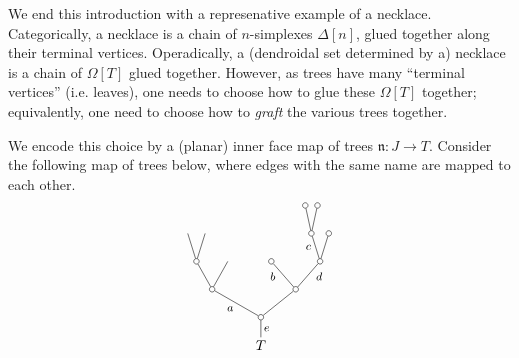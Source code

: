 \documentclass[a4paper,10pt
,draft
]{article}%
\numberwithin{equation}{section}
\numberwithin{figure}{section}
\theoremstyle{definition} %
\newcommand{\1}{\ensuremath{\mathbbm 1}}%
\begin{document}

We end this introduction with a represenative example of a necklace.
Categorically, a necklace is a chain of $n$-simplexes $\Delta[n]$, glued together along their terminal vertices.
Operadically, a (dendroidal set determined by a) necklace is a chain of $\Omega[T]$ glued together.
However, as trees have many ``terminal vertices'' (i.e. leaves),
one needs to choose how to glue these $\Omega[T]$ together;
equivalently, one need to choose how to \textit{graft} the various trees together.

We encode this choice by a (planar) inner face map of trees $\mathfrak n \colon J \to T$.
Consider the following map of trees below, where
edges with the same name are mapped to each other.
\begin{equation}
        \label{NECKEX_EQ}
        \begin{tikzpicture}[grow=up,auto,level distance=2em, every node/.style = {font=\footnotesize,inner sep=2pt},
                dummy/.style={circle,draw,inner sep=0pt,minimum size=1.375mm}]                
                \tikzstyle{level 2}=[sibling distance=3.5em]%
                \tikzstyle{level 3}=[sibling distance=2.25em]%
                \tikzstyle{level 4}=[sibling distance=1.25em]%
                \tikzstyle{level 5}=[sibling distance=0.875em]%
                \node (T) at (7,0) [font=\normalsize] {$T$}
                child{node [dummy] {}
                  child[sibling distance =5em]{node [dummy] {}
                    child[sibling distance =3.5em]{node [dummy] {}
                      child{node [dummy] {}
                      }
                      child{node [dummy] {}
                        child{node [dummy] {}}
                        child{node [dummy] {}}
                        edge from parent node [near end] {$c$}}
                      edge from parent node [swap, near end] {$d$}}
                    child[sibling distance =3.5em]{node [dummy] {}
                      edge from parent node [near end] {$b$}}
                  }
                  child[sibling distance =7em]{node [dummy] {}
                    child
                    child{node [dummy] {}
                      child
                      child
                    }
                    edge from parent node {$a$}}
                  edge from parent node [swap] {$e$}
                };
                \tikzstyle{level 2}=[sibling distance=2.3em]%
                \tikzstyle{level 3}=[sibling distance=2em]%
                \tikzstyle{level 4}=[sibling distance=1em]%

\end{tikzpicture}
\end{equation}
\end{document}
